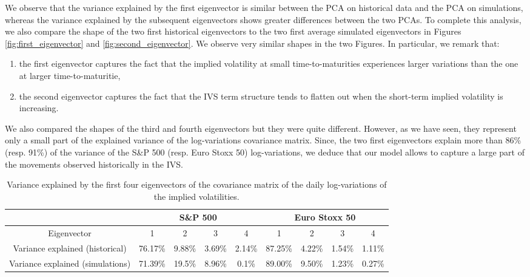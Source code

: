 We observe that the variance explained by the first eigenvector is similar between the PCA on historical data and the PCA on simulations, whereas the variance explained by the subsequent eigenvectors shows greater differences between the two PCAs. To complete this analysis, we also compare the shape of the two first historical eigenvectors to the two first average simulated eigenvectors in Figures \ref{fig:first_eigenvector} and \ref{fig:second_eigenvector}. We observe very similar shapes in the two Figures. In particular, we remark that:
\begin{enumerate}
    \item the first eigenvector captures the fact that the implied volatility at small time-to-maturities experiences larger variations than the one at larger time-to-maturitie,
    \item the second eigenvector captures the fact that the IVS term structure tends to flatten out when the short-term implied volatility is increasing. 
\end{enumerate}
We also compared the shapes of the third and fourth eigenvectors but they were quite different. However, as we have seen, they represent only a small part of the explained variance of the log-variations covariance matrix. Since, the two first eigenvectors explain more than 86\% (resp. 91\%) of the variance of the S\&P 500 (resp. Euro Stoxx 50) log-variations, we deduce that our model allows to capture a large part of the movements observed historically in the IVS. 


\begin{table}[]
    \centering
    \caption{Variance explained by the first four eigenvectors of the covariance matrix of the daily log-variations of the implied volatilities.}
    \label{tab:explained_variance}
    \begin{tabular}{@{}ccccccccc@{}}
    \toprule
     & \multicolumn{4}{c}{S\&P 500} & \multicolumn{4}{c}{Euro Stoxx 50} \\ \midrule
    Eigenvector & 1     & 2        & 3        & 4&  1        &   2       &   3  &4      \\\midrule
    Variance explained (historical) & 76.17\%
     & 9.88\%        & 3.69\%        &  2.14\%       &  87.25\%         &  4.22\%         &   1.54\%& 1.11\%        \\
    Variance explained (simulations) &  71.39\%       &   19.5\%      &   8.96\%      &    0.1\%       &    89.00\%        & 9.50\% & 1.23\% & 0.27\%          \\ \bottomrule
    \end{tabular}
\end{table}

